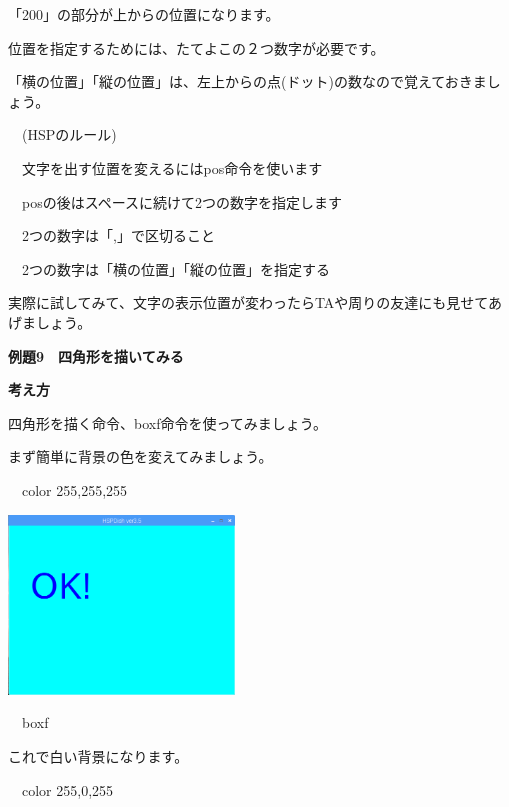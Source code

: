 \documentclass[a4paper,dvipdfmx]{jarticle}
\newcommand\textstyleqwerty[1]{#1}
\begin{document}
「200」の部分が上からの位置になります。

位置を指定するためには、たてよこの２つ数字が必要です。

「横の位置」「縦の位置」は、左上からの点(ドット)の数なので覚えておきましょう。


\bigskip

\ \ (HSPのルール)


\bigskip

\ \ 文字を出す位置を変えるにはpos命令を使います

\ \ posの後はスペースに続けて2つの数字を指定します

\ \ 2つの数字は「,」で区切ること

\ \ 2つの数字は「横の位置」「縦の位置」を指定する


\bigskip

実際に試してみて、文字の表示位置が変わったらTAや周りの友達にも見せてあげましょう。


\bigskip

\clearpage
\textstyleqwerty{\textbf{例題9　四角形を描いてみる}}


\bigskip

{\bfseries
考え方}


\bigskip

四角形を描く命令、boxf命令を使ってみましょう。

まず簡単に背景の色を変えてみましょう。


\bigskip

\textstyleqwerty{\ \ color 255,255,255}

\begin{center}
\includegraphics[width=6.006cm,height=4.77cm]{text02-img/text02-img036.png}

\end{center}
\ \ boxf


\bigskip

これで白い背景になります。


\bigskip

\ \ color 255,0,255
\end{document}
